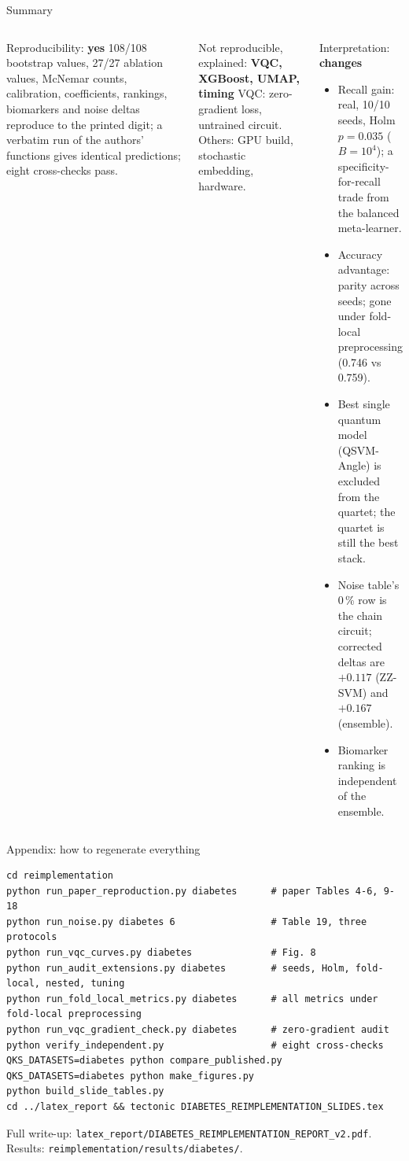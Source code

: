 \documentclass[aspectratio=169,10pt,t,xcolor={table}]{beamer}
\newcommand{\ok}[1]{\textcolor{qgreen}{\textbf{#1}}}
\newcommand{\bad}[1]{\textcolor{qred}{\textbf{#1}}}
\newcommand{\warn}[1]{\textcolor{qamber}{\textbf{#1}}}
\newcommand{\code}[1]{\texttt{\small #1}}
\begin{document}
\begin{frame}{Summary}
\begin{columns}[T]
\begin{block}{Reproducibility: \ok{yes}}
\footnotesize 108/108 bootstrap values, 27/27 ablation values, McNemar counts, calibration, coefficients, rankings, biomarkers and noise deltas reproduce to the printed digit; a verbatim run of the authors' functions gives identical predictions; eight cross-checks pass.
\end{block}
\begin{block}{Not reproducible, explained: \warn{VQC, XGBoost, UMAP, timing}}
\footnotesize VQC: zero-gradient loss, untrained circuit. Others: GPU build, stochastic embedding, hardware.
\end{block}
\begin{alertblock}{Interpretation: \bad{changes}}
\footnotesize
\begin{itemize}
  \item Recall gain: real, 10/10 seeds, Holm $p=0.035$ ($B=10^4$); a specificity-for-recall trade from the balanced meta-learner.
  \item Accuracy advantage: parity across seeds; gone under fold-local preprocessing (0.746 vs 0.759).
  \item Best single quantum model (QSVM-Angle) is excluded from the quartet; the quartet is still the best stack.
  \item Noise table's 0\,\% row is the chain circuit; corrected deltas are $+0.117$ (ZZ-SVM) and $+0.167$ (ensemble).
  \item Biomarker ranking is independent of the ensemble.
\end{itemize}
\end{alertblock}
\end{columns}
\end{frame}

\appendix
\begin{frame}[fragile]{Appendix: how to regenerate everything}
\footnotesize
\begin{verbatim}
cd reimplementation
python run_paper_reproduction.py diabetes      # paper Tables 4-6, 9-18
python run_noise.py diabetes 6                 # Table 19, three protocols
python run_vqc_curves.py diabetes              # Fig. 8
python run_audit_extensions.py diabetes        # seeds, Holm, fold-local, nested, tuning
python run_fold_local_metrics.py diabetes      # all metrics under fold-local preprocessing
python run_vqc_gradient_check.py diabetes      # zero-gradient audit
python verify_independent.py                   # eight cross-checks
QKS_DATASETS=diabetes python compare_published.py
QKS_DATASETS=diabetes python make_figures.py
python build_slide_tables.py
cd ../latex_report && tectonic DIABETES_REIMPLEMENTATION_SLIDES.tex
\end{verbatim}
Full write-up: \code{latex\_report/DIABETES\_REIMPLEMENTATION\_REPORT\_v2.pdf}. Results: \code{reimplementation/results/diabetes/}.
\end{frame}
\end{document}
